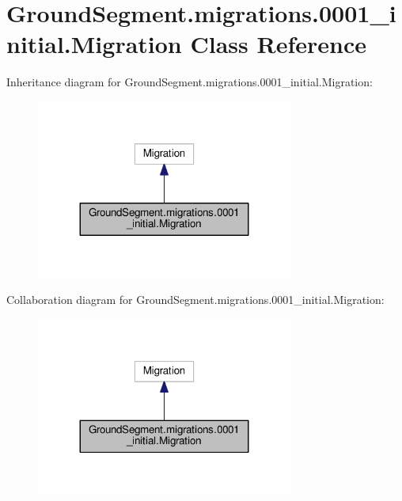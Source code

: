 \hypertarget{class_ground_segment_1_1migrations_1_10001__initial_1_1_migration}{}\section{Ground\+Segment.\+migrations.0001\+\_\+initial.Migration Class Reference}
\label{class_ground_segment_1_1migrations_1_10001__initial_1_1_migration}


Inheritance diagram for Ground\+Segment.\+migrations.0001\+\_\+initial.Migration\+:\nopagebreak
\begin{figure}[H]
\begin{center}
\leavevmode
\includegraphics[width=239pt]{class_ground_segment_1_1migrations_1_10001__initial_1_1_migration__inherit__graph}
\end{center}
\end{figure}


Collaboration diagram for Ground\+Segment.\+migrations.0001\+\_\+initial.Migration\+:\nopagebreak
\begin{figure}[H]
\begin{center}
\leavevmode
\includegraphics[width=239pt]{class_ground_segment_1_1migrations_1_10001__initial_1_1_migration__coll__graph}
\end{center}
\end{figure}
